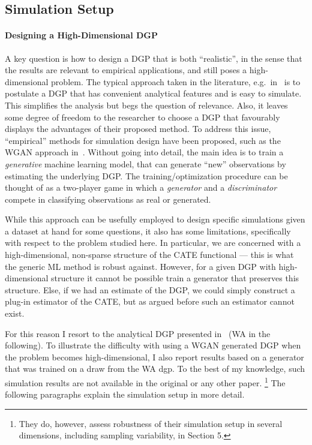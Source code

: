 \documentclass[11pt, a4paper, leqno]{article}
\begin{document}
\subsection{Simulation Setup}
\paragraph*{Designing a High-Dimensional DGP}
A key question is how to design a DGP that is both ``realistic'', in the sense that the results are relevant to empirical applications, and still poses a high-dimensional problem.
The typical approach taken in the literature, e.g.\ in~\cite{wager2018estimation} is to postulate a DGP that has convenient analytical features and is easy to simulate.
This simplifies the analysis but begs the question of relevance. Also, it leaves some degree of freedom to the researcher to choose a DGP that favourably displays the advantages of their proposed method.
To address this issue, ``empirical'' methods for simulation design have been proposed, such as the WGAN approach in~\cite{athey2024wgan}.
Without going into detail, the main idea is to train a \textit{generative} machine learning model, that can generate ``new'' observations by estimating the underlying DGP.\@
The training/optimization procedure can be thought of as a two-player game in which a \textit{generator} and a \textit{discriminator} compete in classifying observations as real or generated.

While this approach can be usefully employed to design specific simulations given a dataset at hand for some questions, it also has some limitations, specifically with respect to the problem studied here.
In particular, we are concerned with a high-dimensional, non-sparse structure of the CATE functional --- this is what the generic ML method is robust against.
However, for a given DGP with high-dimensional structure it cannot be possible train a generator that preserves this structure.
Else, if we had an estimate of the DGP, we could simply construct a plug-in estimator of the CATE, but as argued before such an estimator cannot exist.

For this reason I resort to the analytical DGP presented in~\cite{wager2018estimation} (WA in the following).
To illustrate the difficulty with using a WGAN generated DGP when the problem becomes high-dimensional, I also report results based on a generator that was trained on a draw from the WA dgp.
To the best of my knowledge, such simulation results are not available in the original or any other paper.
\footnote{They do, however, assess robustness of their simulation setup in several dimensions, including sampling variability, in Section 5.}
The following paragraphs explain the simulation setup in more detail.
\end{document}
